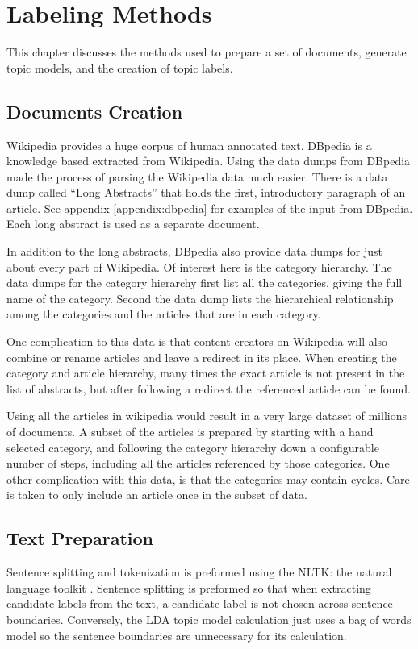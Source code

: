 \chapter{Labeling Methods}

This chapter discusses the methods used to prepare a set of documents, generate topic models, and the creation of topic labels.

\section{Documents Creation}

Wikipedia provides a huge corpus of human annotated text.  DBpedia \cite{lehmann2015dbpedia} is a knowledge based extracted from Wikipedia.  Using the data dumps from DBpedia made the process of parsing the Wikipedia data much easier.  There is a data dump called ``Long Abstracts'' that holds the first, introductory paragraph of an article.  See appendix \ref{appendix:dbpedia} for examples of the input from DBpedia.  Each long abstract is used as a separate document.

In addition to the long abstracts, DBpedia also provide data dumps for just about every part of Wikipedia.  Of interest here is the category hierarchy.  The data dumps for the category hierarchy first list all the categories, giving the full name of the category.  Second the data dump lists the hierarchical relationship among the categories and the articles that are in each category.  

One complication to this data is that content creators on Wikipedia will also combine or rename articles and leave a redirect in its place.  When creating the category and article hierarchy, many times the exact article is not present in the list of abstracts, but after following a redirect the referenced article can be found.

Using all the articles in wikipedia would result in a very large dataset of millions of documents.  A subset of the articles is prepared by starting with a hand selected category, and following the category hierarchy down a configurable number of steps, including all the articles referenced by those categories.  One other complication with this data, is that the categories may contain cycles.  Care is taken to only include an article once in the subset of data.

\section{Text Preparation}
Sentence splitting and tokenization is preformed using the NLTK: the natural language toolkit \cite{bird2006nltk}.  Sentence splitting is preformed so that when extracting candidate labels from the text, a candidate label is not chosen across sentence boundaries.  Conversely, the LDA topic model calculation just uses a bag of words model so the sentence boundaries are unnecessary for its calculation.

